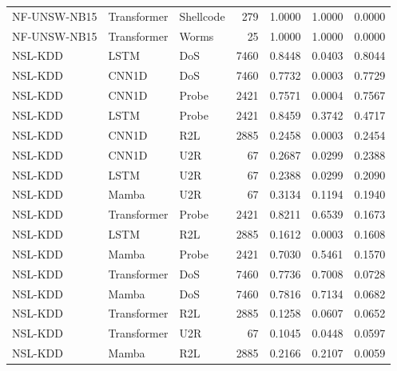 \begin{table}[ht]
\begin{tabular}{lllrrrr}
NF-UNSW-NB15 & Transformer & Shellcode & 279 & 1.0000 & 1.0000 & 0.0000 \\
NF-UNSW-NB15 & Transformer & Worms & 25 & 1.0000 & 1.0000 & 0.0000 \\
NSL-KDD & LSTM & DoS & 7460 & 0.8448 & 0.0403 & 0.8044 \\
NSL-KDD & CNN1D & DoS & 7460 & 0.7732 & 0.0003 & 0.7729 \\
NSL-KDD & CNN1D & Probe & 2421 & 0.7571 & 0.0004 & 0.7567 \\
NSL-KDD & LSTM & Probe & 2421 & 0.8459 & 0.3742 & 0.4717 \\
NSL-KDD & CNN1D & R2L & 2885 & 0.2458 & 0.0003 & 0.2454 \\
NSL-KDD & CNN1D & U2R & 67 & 0.2687 & 0.0299 & 0.2388 \\
NSL-KDD & LSTM & U2R & 67 & 0.2388 & 0.0299 & 0.2090 \\
NSL-KDD & Mamba & U2R & 67 & 0.3134 & 0.1194 & 0.1940 \\
NSL-KDD & Transformer & Probe & 2421 & 0.8211 & 0.6539 & 0.1673 \\
NSL-KDD & LSTM & R2L & 2885 & 0.1612 & 0.0003 & 0.1608 \\
NSL-KDD & Mamba & Probe & 2421 & 0.7030 & 0.5461 & 0.1570 \\
NSL-KDD & Transformer & DoS & 7460 & 0.7736 & 0.7008 & 0.0728 \\
NSL-KDD & Mamba & DoS & 7460 & 0.7816 & 0.7134 & 0.0682 \\
NSL-KDD & Transformer & R2L & 2885 & 0.1258 & 0.0607 & 0.0652 \\
NSL-KDD & Transformer & U2R & 67 & 0.1045 & 0.0448 & 0.0597 \\
NSL-KDD & Mamba & R2L & 2885 & 0.2166 & 0.2107 & 0.0059 \\
\bottomrule
\end{tabular}

\end{table}
